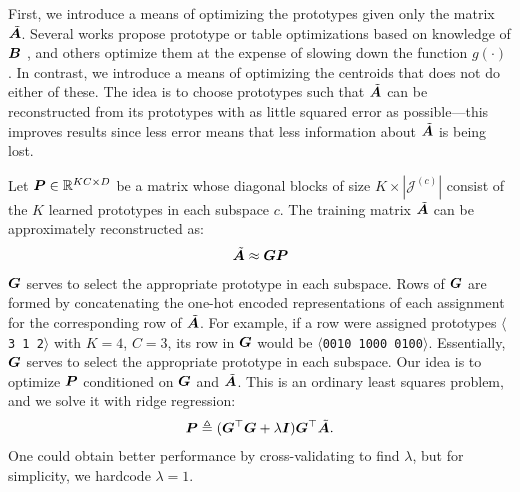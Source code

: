 First, we introduce a means of optimizing the prototypes given only the matrix $\tilde{\bm{A}}$. Several works propose prototype or table optimizations based on knowledge of $\bm{B}$ \cite{pairq,optimizedDists}, and others optimize them at the expense of slowing down the function $g(\cdot)$ \cite{cq,scq}. In contrast, we introduce a means of optimizing the centroids that does not do either of these. The idea is to choose prototypes such that $\tilde{\bm{A}}$ can be reconstructed from its prototypes with as little squared error as possible---this improves results since less error means that less information about $\tilde{\bm{A}}$ is being lost.

Let $\bm{P} \in \mathbb{R}^{KC \times D}$ be a matrix whose diagonal blocks of size $K \times |\mathcal{J}^{(c)}|$ consist of the $K$ learned prototypes in each subspace $c$. The training matrix $\tilde{\bm{A}}$ can be approximately reconstructed as:
\begin{align}
    \tilde{\bm{A}} \approx \bm{G}\bm{P}
\end{align}
$\bm{G}$ serves to select the appropriate prototype in each subspace. Rows of $\bm{G}$ are formed by concatenating the one-hot encoded representations of each assignment for the corresponding row of $\tilde{\bm{A}}$. For example, if a row were assigned prototypes $\langle$\texttt{3 1 2}$\rangle$ with $K = 4$, $C = 3$, its row in $\bm{G}$ would be $\langle$\texttt{0010 1000 0100}$\rangle$. Essentially, $\bm{G}$ serves to select the appropriate prototype in each subspace. Our idea is to optimize $\bm{P}$ conditioned on $\bm{G}$ and $\tilde{\bm{A}}$. This is an ordinary least squares problem, and we solve it with ridge regression:
\begin{align}
\vspace*{-1mm}
    \mat{P} \triangleq (\mat{G}^\top \mat{G} + \lambda \mat{I}) \mat{G}^\top \tilde{\A}.
\end{align}
One could obtain better performance by cross-validating to find $\lambda$, but for simplicity, we hardcode $\lambda = 1$. %


